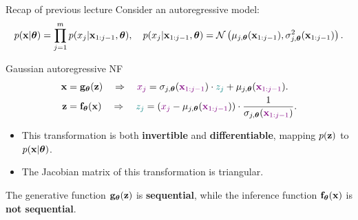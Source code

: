 \documentclass{beamer}
\begin{document}
\begin{frame}{Recap of previous lecture}
	Consider an autoregressive model:
	\vspace{-0.3cm}
	{\small
		\[
		p(\mathbf{x} | \boldsymbol{\theta}) = \prod_{j=1}^m p(x_j | \mathbf{x}_{1:j - 1}, \boldsymbol{\theta}), \quad
		p(x_j | \mathbf{x}_{1:j - 1}, \boldsymbol{\theta}) = \mathcal{N} \left(\mu_{j, \boldsymbol{\theta}}(\mathbf{x}_{1:j-1}), \sigma^2_{j, \boldsymbol{\theta}} (\mathbf{x}_{1:j-1})\right).
		\]
	}
	\vspace{-0.5cm}
	\begin{block}{Gaussian autoregressive NF}
		\vspace{-0.5cm}
		\begin{align*}
			\mathbf{x} &= \mathbf{g}_{\boldsymbol{\theta}}(\mathbf{z}) \quad \Rightarrow \quad {\color{violet} x_j} = \sigma_{j, \boldsymbol{\theta}} ({\color{violet} \mathbf{x}_{1:j-1}}) \cdot {\color{teal} z_j} + \mu_{j, \boldsymbol{\theta}}({\color{violet} \mathbf{x}_{1:j-1}}). \\
			\mathbf{z} &= \mathbf{f}_{\boldsymbol{\theta}}(\mathbf{x}) \quad \Rightarrow \quad {\color{teal} z_j} = \left({\color{violet}x_j} - \mu_{j, \boldsymbol{\theta}}({\color{violet}\mathbf{x}_{1:j-1}}) \right) \cdot \frac{1}{ \sigma_{j, \boldsymbol{\theta}} ({\color{violet}\mathbf{x}_{1:j-1}})}.
		\end{align*}
		\vspace{-0.5cm}
	\end{block}
	\begin{itemize}
		\item This transformation is both \textbf{invertible} and \textbf{differentiable}, mapping $p(\mathbf{z})$ to $p(\mathbf{x} | \boldsymbol{\theta})$.
		\item The Jacobian matrix of this transformation is triangular.
	\end{itemize}
	The generative function $\mathbf{g}_{\boldsymbol{\theta}}(\mathbf{z})$ is \textbf{sequential}, while the inference function $\mathbf{f}_{\boldsymbol{\theta}}(\mathbf{x})$ is \textbf{not sequential}.
	
\end{frame}
\end{document}
